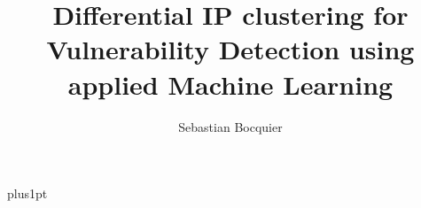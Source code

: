 \documentclass[12pt]{dissertation}
\title{Differential IP clustering for Vulnerability Detection using applied Machine Learning}
\author{Sebastian Bocquier}             %
\begin{document}
\baselineskip=18pt plus1pt

\setcounter{secnumdepth}{3}
\setcounter{tocdepth}{3}


\maketitle                  %

\begin{romanpages}          %
\tableofcontents            %
\listoffigures              %
\end{romanpages}            %


%

%
%
%

\appendix



\end{document}
